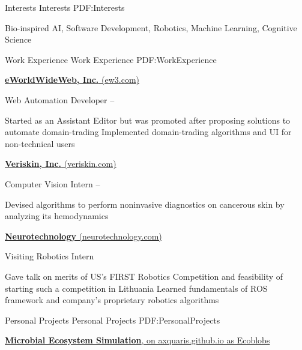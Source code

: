 \documentclass[letterpaper,MMMyyyy,nonstopmode]{simpleresumecv}
\begin{document}
\begin{Body}

\Section
{Interests}
{Interests}
{PDF:Interests}

\Entry
Bio-inspired AI, Software Development, Robotics, Machine Learning,
Cognitive Science


\Section
{Work Experience}
{Work Experience}
{PDF:WorkExperience}

\Entry
\href{http://ew3.com/}
{\textbf{eWorldWideWeb, Inc.} (ew3.com)}

\Gap
\BulletItem
Web Automation Developer
\hfill
{} --
\begin{Detail}
\SubBulletItem
Started as an Assistant Editor but was promoted after proposing solutions
to automate domain-trading
\SubBulletItem
Implemented domain-trading algorithms and UI for non-technical users
\end{Detail}

\BigGap
\Entry
\href{http://www.veriskin.com/}
{\textbf{Veriskin, Inc.} (veriskin.com)}

\Gap
\BulletItem
Computer Vision Intern
\hfill
{} --
\begin{Detail}
\SubBulletItem
Devised algorithms to perform noninvasive diagnostics on cancerous skin by analyzing its hemodynamics
\end{Detail}

\BigGap
\Entry
\href{http://www.neurotechnology.com/}
{\textbf{Neurotechnology} (neurotechnology.com)}

\Gap
\BulletItem
Visiting Robotics Intern
\hfill
{}
\begin{Detail}
\SubBulletItem
Gave talk on merits of US's FIRST Robotics Competition and feasibility of starting
such a competition in Lithuania
\SubBulletItem
Learned fundamentals of ROS framework and company’s proprietary robotics algorithms
\end{Detail}


\Section
{Personal Projects}
{Personal Projects}
{PDF:PersonalProjects}

\Entry
\href{http://axquaris.github.io/}
{\textbf{Microbial Ecosystem Simulation}, on axquaris.github.io as Ecoblobs}


\end{Body}
\end{document}
